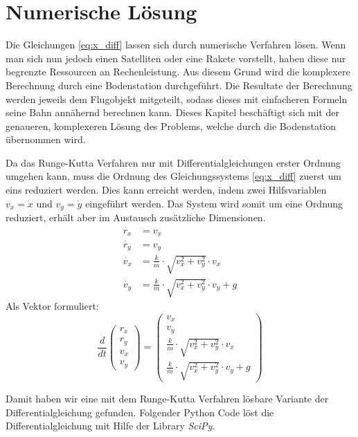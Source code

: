 \section{Numerische Lösung
\label{perturbation:section:nummerischeloesung}}
Die Gleichungen \eqref{eq:x_diff} lassen sich durch numerische Verfahren lösen. 
Wenn man sich nun jedoch einen Satelliten oder eine Rakete vorstellt, haben diese nur begrenzte Ressourcen an Rechenleistung. 
Aus diesem Grund wird die komplexere Berechnung durch eine Bodenstation durchgeführt. 
Die Resultate der Berechnung werden jeweils dem Flugobjekt mitgeteilt, sodass dieses mit einfacheren Formeln seine Bahn annähernd berechnen kann. 
Dieses Kapitel beschäftigt sich mit der genaueren, komplexeren Lösung des Problems, welche durch die Bodenstation übernommen wird.

Da das Runge-Kutta Verfahren nur mit Differentialgleichungen erster Ordnung umgehen kann, muss die Ordnung des Gleichungssystems \eqref{eq:x_diff}  zuerst um eins reduziert werden. 
Dies kann erreicht werden, indem zwei Hilfsvariablen $v_x = \dot{x}$ und $v_y = \dot{y}$ eingeführt werden. 
Das System wird somit um eine Ordnung reduziert, erhält aber im Austausch zusätzliche Dimensionen.
\begin{equation*}
\begin{aligned}
	\dot{r_x} &= v_x  \\
	\dot{r_y} &= v_y \\
	\dot{v_x} &= \frac{k}{m} \cdot \sqrt{v_x^2 + v_y^2} \cdot v_x \\
	\dot{v_y} &= \frac{k}{m} \cdot \sqrt{v_x^2 + v_y^2} \cdot v_y + g
\end{aligned}
\end{equation*}
Als Vektor formuliert:
\[
\frac{d}{dt}\begin{pmatrix}r_x\\r_y\\v_x\\v_y\end{pmatrix} = \begin{pmatrix}v_x\\v_y\\\frac{k}{m} \cdot \sqrt{v_x^2 + v_y^2} \cdot v_x\\\frac{k}{m} \cdot \sqrt{v_x^2 + v_y^2} \cdot v_y + g\end{pmatrix}
\]

Damit haben wir eine mit dem  Runge-Kutta Verfahren lösbare Variante der Differentialgleichung gefunden. 
Folgender Python Code löst die Differentialgleichung mit Hilfe der Library \textit{SciPy}.

